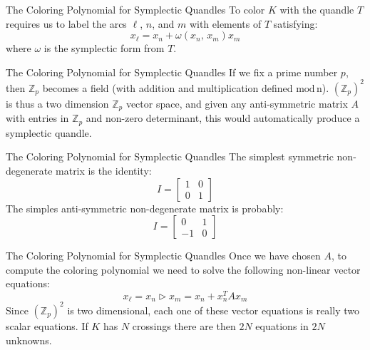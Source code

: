 \documentclass{beamer}
\begin{document}
    \begin{frame}{The Coloring Polynomial for Symplectic Quandles}
        To color $K$ with the quandle $T$ requires us to label the arcs
        $\ell$, $n$, and $m$ with elements of $T$ satisfying:
        \begin{equation}
            x_{\ell}
            =x_{n}+\omega(x_{n},\,x_{m})x_{m}
        \end{equation}
        where $\omega$ is the symplectic form from $T$.
    \end{frame}
    \begin{frame}{The Coloring Polynomial for Symplectic Quandles}
        If we fix a prime number $p$, then $\mathbb{Z}_{p}$ becomes a field
        (with addition and multiplication defined $\textrm{mod}\,\textrm{n}$).
        $(\mathbb{Z}_{p})^{2}$ is thus a two dimension $\mathbb{Z}_{p}$
        vector space, and given any anti-symmetric matrix $A$ with entries in
        $\mathbb{Z}_{p}$ and non-zero determinant, this would automatically
        produce a symplectic quandle.
    \end{frame}
    \begin{frame}{The Coloring Polynomial for Symplectic Quandles}
        The simplest symmetric non-degenerate matrix is the identity:
        \begin{equation}
            I=
            \begin{bmatrix}
                1&0\\
                0&1
            \end{bmatrix}
        \end{equation}
        The simples anti-symmetric non-degenerate matrix is probably:
        \begin{equation}
            I=
            \begin{bmatrix}
                0&1\\
                -1&0
            \end{bmatrix}
        \end{equation}
    \end{frame}
    \begin{frame}{The Coloring Polynomial for Symplectic Quandles}
        Once we have chosen $A$, to compute the coloring polynomial we need to
        solve the following non-linear vector equations:
        \begin{equation}
            x_{\ell}=x_{n}\triangleright{x}_{m}=x_{n}+x_{n}^{T}Ax_{m}
        \end{equation}
        Since $(\mathbb{Z}_{p})^{2}$ is two dimensional, each one of these
        vector equations is really two scalar equations. If $K$ has $N$
        crossings there are then $2N$ equations in $2N$ unknowns.
    \end{frame}
\end{document}
